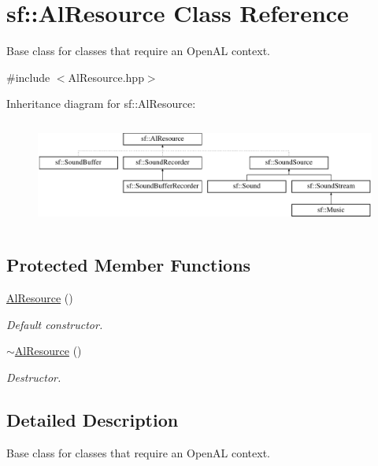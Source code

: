 \hypertarget{classsf_1_1_al_resource}{}\section{sf\+:\+:Al\+Resource Class Reference}
\label{classsf_1_1_al_resource}


Base class for classes that require an Open\+AL context.  




{\ttfamily \#include $<$Al\+Resource.\+hpp$>$}

Inheritance diagram for sf\+:\+:Al\+Resource\+:\begin{figure}[H]
\begin{center}
\leavevmode
\includegraphics[height=3.500000cm]{classsf_1_1_al_resource}
\end{center}
\end{figure}
\subsection*{Protected Member Functions}
\begin{DoxyCompactItemize}
\item 
\mbox{\hyperlink{classsf_1_1_al_resource_a51b4f3a825c5d68386f8683e3e1053d7}{Al\+Resource}} ()
\begin{DoxyCompactList}\small\item\em Default constructor. \end{DoxyCompactList}\item 
\mbox{\hyperlink{classsf_1_1_al_resource_a74ad78198cddcb6e5d847177364049db}{$\sim$\+Al\+Resource}} ()
\begin{DoxyCompactList}\small\item\em Destructor. \end{DoxyCompactList}\end{DoxyCompactItemize}


\subsection{Detailed Description}
Base class for classes that require an Open\+AL context. 

